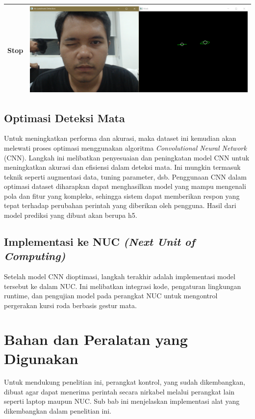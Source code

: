 \begin{table}[H]
\begin{tabular}{|c|c|}
        Stop               & \includegraphics[scale=0.25]{gambar/bab3/stop.png}  \\ \hline
    \end{tabular}
\end{table}

\subsection{Optimasi Deteksi Mata}

Untuk meningkatkan performa dan akurasi, maka dataset ini kemudian akan melewati proses optimasi menggunakan algoritma \emph{Convolutional Neural Network} (CNN). Langkah ini melibatkan penyesuaian dan peningkatan model CNN untuk meningkatkan akurasi dan efisiensi dalam deteksi mata. Ini mungkin termasuk teknik seperti augmentasi data, tuning parameter, dsb. Penggunaan CNN dalam optimasi dataset diharapkan dapat menghasilkan model yang mampu mengenali pola dan fitur yang kompleks, sehingga sistem dapat memberikan respon yang tepat terhadap perubahan perintah yang diberikan oleh pengguna. Hasil dari model prediksi yang dibuat akan berupa h5.

\subsection{Implementasi ke NUC \textit{(Next Unit of Computing)}}

Setelah model CNN dioptimasi, langkah terakhir adalah implementasi model tersebut ke dalam NUC. Ini melibatkan integrasi kode, pengaturan lingkungan runtime, dan pengujian model pada perangkat NUC untuk mengontrol pergerakan kursi roda berbasis gestur mata.


\section{Bahan dan Peralatan yang Digunakan}

Untuk mendukung penelitian ini, perangkat kontrol, yang sudah dikembangkan, dibuat agar dapat menerima perintah secara nirkabel melalui perangkat lain seperti laptop maupun NUC. Sub bab ini menjelaskan implementasi alat yang dikembangkan dalam penelitian ini.

